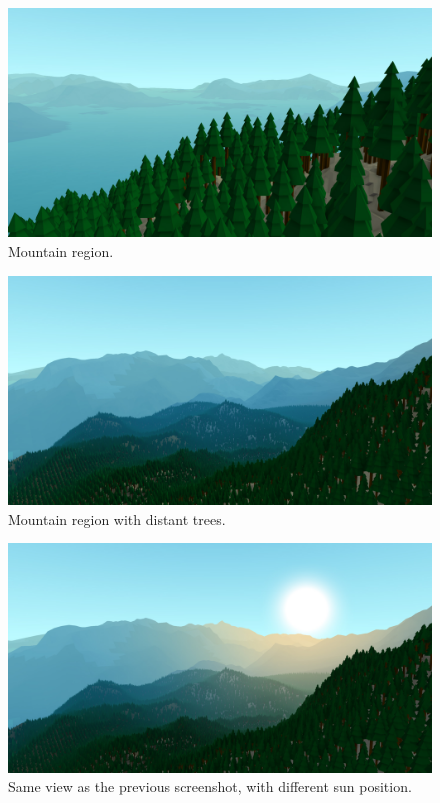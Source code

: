 \begin{figure}
	\centering
		\includegraphics[width=1.0\textwidth]{figures/Screenshot000002.jpg}
	\caption{Mountain region.}
	\label{fig:screenshot02}
\end{figure}

\begin{figure}
	\centering
		\includegraphics[width=1.0\textwidth]{figures/Screenshot000003.jpg}
	\caption{Mountain region with distant trees.}
	\label{fig:screenshot03}
\end{figure}

\begin{figure}
	\centering
		\includegraphics[width=1.0\textwidth]{figures/Screenshot000004.jpg}
	\caption{Same view as the previous screenshot, with different sun position.}
	\label{fig:screenshot04}
\end{figure}

